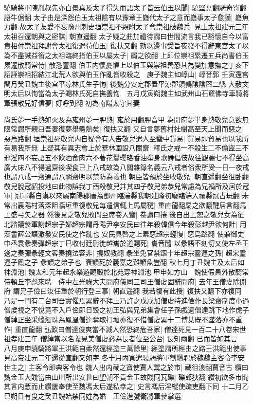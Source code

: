 驍騎將軍陳胤叔先亦白景真及太子得失而語太子皆云伯玉以聞|{
	驍堅堯翻騎奇寄翻語牛倨翻}
太子由是深怨伯玉太祖隂有以豫章王嶷代太子之意而嶷事太子愈謹|{
	嶷魚力翻}
故太子友愛不衰豫州刺史垣崇祖不親附太子會崇祖破魏兵|{
	見上太祖建元三年}
太祖召還朝與之密謀|{
	朝直遥翻}
太子疑之曲加禮待謂曰世間流言我已豁懷自今以富貴相付崇祖拜謝會太祖復遣荀伯玉|{
	復扶又翻}
勑以邊事受旨夜發不得辭東宫太子以為不盡誠益銜之太祖臨終指伯玉以屬太子|{
	屬之欲翻}
上即位崇祖累遷五兵尚書伯玉累遷散騎常侍|{
	散悉亶翻}
伯玉内懷憂懼上以伯玉與崇祖善恐其為變加意撫之丁亥下詔誣崇祖招結江北荒人欲與伯玉作亂皆收殺之　庚子魏主如崞山|{
	崞音郭}
壬寅還宫　閏月癸丑魏主後宫平凉林氏生子恂|{
	後魏分安定郡置平涼郡領鶉隂隂密二縣}
大赦文明太后以恂當為太子賜林氏死自撫養恂　五月戊寅朔魏主如武州山石窟佛寺車騎將軍張敬兒好信夢|{
	好呼到翻}
初為南陽太守其妻

尚氏夢一手熱如火及為雍州夢一胛熱|{
	雍於用翻胛音甲}
為開府夢半身熱敬兒意欲無限常謂所親曰吾妻復夢舉體熱矣|{
	復扶又翻}
又自言夢舊村社樹高至天上聞而惡之|{
	惡烏路翻}
垣崇祖死敬兒内自疑會有人告敬兒遣人至蠻中貨易|{
	貨易即貿易也以我所有易我所無}
上疑其有異志會上於華林園設八關齋|{
	釋氏之戒一不殺生二不偷盜三不邪淫四不妄語五不飲酒食肉六不著花鬘瓔珞香油塗身歌舞倡伎故往觀聼七不得坐高廣大床八不得過齋後喫食已上八戒故為八關雜錄名義云八戒者俗衆所受一日一夜戒也謂八戒一齋通謂八關齋明以禁防為義也}
朝臣皆預於坐收敬兒|{
	朝直遥翻坐徂卧翻}
敬兒脫冠貂投地曰此物誤我丁酉殺敬兒并其四子敬兒弟恭兒常慮為兄禍所及居於冠軍|{
	冠軍縣自漢以來屬南陽郡唐為鄧州臨湍縣我朝建隆初廢臨湍入禳縣冠古玩翻}
未常出襄陽村落深阻牆垣重復敬兒每遣信輒上馬屬鞬|{
	重直龍翻屬之欲翻鞬居言翻馬上盛弓矢之器}
然後見之敬兒敗問至席卷入蠻|{
	卷讀曰捲}
後自出上恕之敬兒女為征北諮議參軍謝超宗子婦超宗謂丹陽尹李安民曰往年殺韓信今年殺彭越尹欲何計|{
	用漢書薛公語激發安民使之作亂也}
安民具啓之上素惡超宗輕慢|{
	惡烏路翻}
使兼御史中丞袁彖奏彈超宗丁巳收付廷尉徙越巂於道賜死|{
	巂音髓}
以彖語不刻切又使左丞王逡之奏彈彖輕文畧奏撓法容非|{
	撓奴教翻}
彖坐免官禁錮十年超宗靈運之孫|{
	超宋靈運子鳳之子}
彖顗之弟子也|{
	衰顗死於義嘉之難顗魚豈翻}
秋七月丁丑魏主及太后如神淵池|{
	魏太和元年起永樂遊觀殿於北苑穿神淵池}
甲申如方山　魏使假員外散騎常侍頓丘李彪來聘　侍中左光祿大夫開府儀同三司王僧䖍固辭開府|{
	去年王僧䖍除開府}
謂兄子儉曰汝任重於朝行登三事|{
	朝直遥翻}
我若復有此授|{
	復扶又翻下亦復同}
乃是一門有二台司吾實懼焉累辭不拜上乃許之戊戌加僧䖍特進儉作長梁齋制度小過僧䖍視之不悅竟不入戶儉即日毁之初王弘與兄弟集會任子孫戲適僧達跳下地作虎子僧綽正坐采蠟燭珠為鳳凰僧達奪取打壞亦復不惜僧䖍累十二博棊既不墜落亦不重作|{
	重直龍翻}
弘歎曰僧達俊爽當不減人然恐終危吾家|{
	僧達死見一百二十八卷宋世祖孝建三年}
僧綽當以名義見美僧䖍必為長者位至公台|{
	長知兩翻}
已而皆如其言　八月庚申驍騎將軍王洪範自柔然還經塗三萬餘里|{
	經塗謂所經由之路王洪範出使事見高帝建元二年還從宣翻又如字}
冬十月丙寅遣驍騎將軍劉纘聘於魏魏主客令李安世主之|{
	主客令即典客令也}
魏人出内藏之寶使賈人鬻之於市|{
	藏徂浪翻賈音古}
纘曰魏金玉大賤當由山川所出安世曰聖朝不貴金玉故賤同瓦礫|{
	礫郎狄翻}
纘初欲多市聞其言内慙而止纘屢奉使至魏馮太后遂私幸之|{
	史言馮后淫縱使疏吏翻下同}
十二月乙巳朔日有食之癸丑魏始禁同姓為婚　王儉進號衛將軍參掌選

